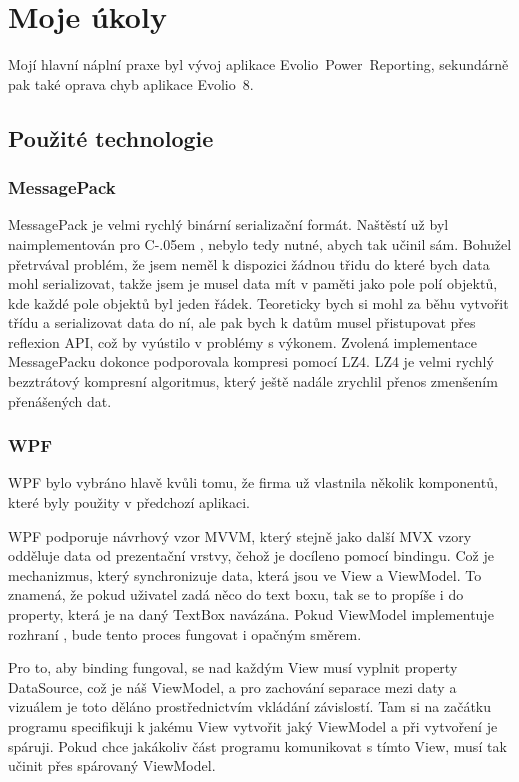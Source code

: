 \documentclass[czech,bachelorpractice,dept460,male,csharp]{diploma}
\newcommand{\EvolioEight}{Evolio~8}
\newcommand{\EFilters}{Evolio~Power~Reporting}
\newcommand{\Csharp}{%
  {\settoheight{\dimen0}{C}C\kern-.05em \resizebox{!}{\dimen0}{\raisebox{\depth}{\#}}}}
\begin{document}
\section{Moje úkoly}
	Mojí hlavní náplní praxe byl vývoj aplikace {\EFilters}, sekundárně pak také oprava chyb aplikace {\EvolioEight}.
	\subsection{Použité technologie}
			\subsubsection{MessagePack}
			MessagePack\cite{mpSpec} je velmi rychlý binární serializační formát. Naštěstí už byl naimplementován pro {\Csharp}, nebylo tedy nutné, abych tak učinil sám. Bohužel přetrvával problém, že jsem neměl k dispozici žádnou třidu do které bych data mohl serializovat, takže jsem je musel data mít v paměti jako pole polí objektů, kde každé pole objektů byl jeden řádek. Teoreticky bych si mohl za běhu vytvořit třídu a serializovat data do ní, ale pak bych k datům musel přistupovat přes reflexion API, což by vyústilo v problémy s výkonem. Zvolená implementace MessagePacku\cite{mpImpl} dokonce podporovala kompresi pomocí LZ4. LZ4\cite{l4z} je velmi rychlý bezztrátový kompresní algoritmus, který ještě nadále zrychlil přenos zmenšením přenášených dat. 
		\subsubsection{WPF}
			WPF bylo vybráno hlavě kvůli tomu, že firma už vlastnila několik komponentů, které byly použity v předchozí aplikaci.
			
			WPF podporuje návrhový vzor MVVM, který stejně jako další MVX vzory odděluje data od prezentační vrstvy, čehož je docíleno pomocí bindingu. Což je mechanizmus, který synchronizuje data, která jsou ve View a ViewModel. To znamená, že pokud uživatel zadá něco do text boxu, tak se to propíše i do property, která je na daný TextBox navázána. Pokud ViewModel implementuje rozhraní , bude tento proces fungovat i opačným směrem.
			
			Pro to, aby binding fungoval, se nad každým View musí vyplnit property DataSource, což je náš ViewModel, a pro zachování separace mezi daty a vizuálem je toto děláno prostřednictvím vkládání závislostí. Tam si na začátku programu specifikuji k jakému View vytvořit jaký ViewModel a při vytvoření je spáruji. Pokud chce jakákoliv část programu komunikovat s tímto View, musí tak učinit přes spárovaný ViewModel.
			
\end{document}

